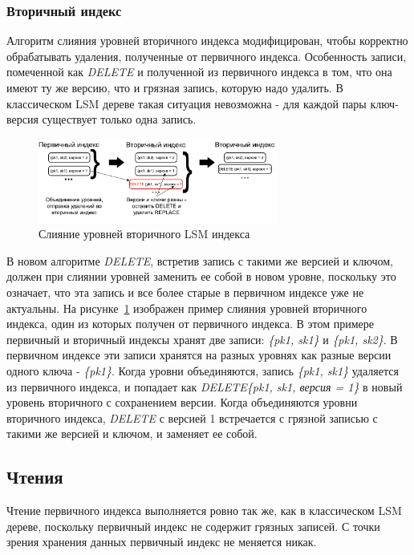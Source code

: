 \documentclass[a4paper,hidelinks,12pt]{article}
\begin{document}
\subsubsection{Вторичный индекс}
Алгоритм слияния уровней вторичного индекса модифицирован, чтобы корректно
обрабатывать удаления, полученные от первичного индекса. Особенность записи,
помеченной как \textit{DELETE} и полученной из первичного индекса в том, что она
имеют ту же версию, что и грязная запись, которую надо удалить. В классическом
LSM дереве такая ситуация невозможна - для каждой пары ключ-версия существует
только одна запись.

\begin{figure}[h]
\centering
\includegraphics[width=0.7\textwidth]{secondary_compaction_example}
\caption{Слияние уровней вторичного LSM индекса}
\label{fig:secondary_compaction_example}
\end{figure}

В новом алгоритме \textit{DELETE}, встретив запись с такими же версией и ключом,
должен при слиянии уровней заменить ее собой в новом уровне, поскольку это
означает, что эта запись и все более старые в первичном индексе уже не
актуальны. На рисунке~\ref{fig:secondary_compaction_example} изображен пример
слияния уровней вторичного индекса, один из которых получен от первичного
индекса. В этом примере первичный и вторичный индексы хранят две записи:
\textit{\{pk1, sk1\}} и \textit{\{pk1, sk2\}}. В первичном индексе эти записи
хранятся на разных уровнях как разные версии одного ключа - \textit{\{pk1\}}.
Когда уровни объединяются, запись \textit{\{pk1, sk1\}} удаляется из первичного
индекса, и попадает как \textit {DELETE\{pk1, sk1, версия = 1\}} в новый уровень
вторичного с сохранением версии. Когда объединяются уровни вторичного индекса,
\textit{DELETE} с версией 1 встречается с грязной записью с такими же версией и
ключом, и заменяет ее собой.

\subsection{Чтения}
Чтение первичного индекса выполняется ровно так же, как в классическом LSM
дереве, поскольку первичный индекс не содержит грязных записей. С точки зрения
хранения данных первичный индекс не меняется никак.
\end{document}
